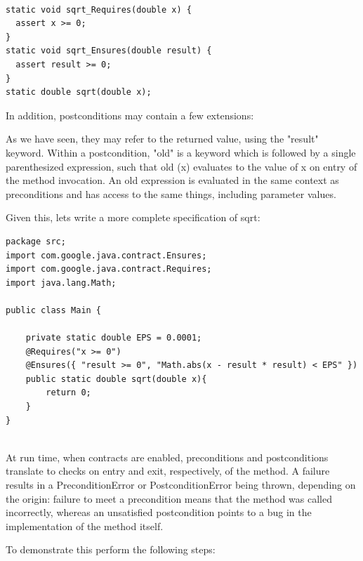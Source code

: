 \documentclass{article}
\begin{document}
\begin{lstlisting}

static void sqrt_Requires(double x) {
  assert x >= 0;
}
static void sqrt_Ensures(double result) {
  assert result >= 0;
}
static double sqrt(double x);

\end{lstlisting}

In addition, postconditions may contain a few extensions:

As we have seen, they may refer to the returned value, using the "result" keyword.
Within a postcondition, "old" is a keyword which is followed by a
single parenthesized expression, such that old (x) evaluates to the
value of x on entry of the method invocation. 
An old expression is evaluated in the same context as preconditions
and has access to the same things, including parameter values. 

Given this, lets write a more complete specification of sqrt:

\begin{lstlisting}
package src;
import com.google.java.contract.Ensures;
import com.google.java.contract.Requires;
import java.lang.Math;

public class Main {

	private static double EPS = 0.0001;
	@Requires("x >= 0")
	@Ensures({ "result >= 0", "Math.abs(x - result * result) < EPS" })
	public static double sqrt(double x){
		return 0;	
	}
}


\end{lstlisting}

At run time, when contracts are enabled, preconditions and postconditions translate to checks on entry and exit, respectively, of the method. A failure results in a PreconditionError or PostconditionError being thrown, depending on the origin: failure to meet a precondition means that the method was called incorrectly, whereas an unsatisfied postcondition points to a bug in the implementation of the method itself.

To demonstrate this perform the following steps:
\end{document}
